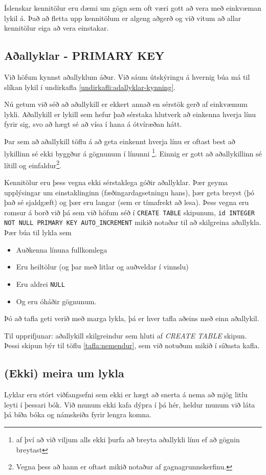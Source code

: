 Íslenskar kennitölur eru dæmi um gögn sem oft væri gott að vera með einkvæman lykil á. Það að fletta upp kennitölum er algeng aðgerð og við vitum að allar kennitölur eiga að vera einstakar.
\subsection{Aðallyklar - PRIMARY KEY}
\label{undirkafli:adallyklar}
Við höfum kynnst aðallyklum áður. Við sáum útskýringu á hvernig búa má til slíkan lykil í undirkafla \ref{undirkafli:adallyklar-kynning}.

Nú getum við séð að aðallykill er ekkert annað en sérstök gerð af einkvæmum lykli. Aðallykill er lykill sem hefur það sérstaka hlutverk að einkenna hverja línu fyrir sig, svo að hægt sé að vísa í hana á ótvíræðan hátt.

Þar sem að aðallykill töflu á að geta einkennt hverja línu er oftast best að lykillinn sé ekki byggður á gögnunum í línunni \footnote{af því að við viljum alls ekki þurfa að breyta aðallykli línu ef að gögnin breytast}. Einnig er gott að aðallykillinn sé lítill og einfaldur\footnote{Vegna þess að hann er oftast mikið notaður af gagnagrunnskerfinu.}. 

Kennitölur eru þess vegna ekki sérstaklega góðir aðallyklar. Þær geyma upplýsingar um einstaklinginn (fæðingardagsetningu hans), þær geta breyst (þó það sé sjaldgæft) og þær eru langar (sem er tímafrekt að lesa). Þess vegna eru romsur á borð við þá sem við höfum séð í \verb|CREATE TABLE| skipunum, \verb|id INTEGER NOT NULL PRIMARY KEY AUTO_INCREMENT| mikið notaðar til að skilgreina aðallykla. Þær búa til lykla sem 
\begin{itemize}
 \item Auðkenna línuna fullkomlega
 \item Eru heiltölur (og þar með litlar og auðveldar í vinnslu)
 \item Eru aldrei \verb|NULL|
 \item Og eru óháðir gögnunum.
\end{itemize}
Þó að tafla geti verið með marga lykla, þá er hver tafla aðeins með einn aðallykil.

\begin{example}
\caption[PRIMARY KEY]{Til upprifjunar: aðallykill skilgreindur sem hluti af \emph{CREATE TABLE} skipun. Þessi skipun býr til töflu \ref{tafla:nemendur}, sem við notuðum mikið í síðasta kafla.}
\label{sql:k5d1-primary-key}
\centering
{}
\end{example}
\subsection{(Ekki) meira um lykla}
Lyklar eru stórt viðfangsefni sem ekki er hægt að snerta á nema að mjög litlu leyti í þessari bók. Við munum ekki kafa dýpra í þá hér, heldur munum við láta þá bíða bóka og námskeiða fyrir lengra komna.

